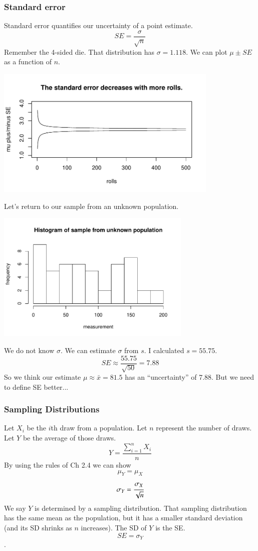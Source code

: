 \begin{frame}
\frametitle{Standard error}
Standard error quantifies our uncertainty of a point estimate.
$$SE = \frac{\sigma}{\sqrt{n}} $$
\pause
Remember the 4-sided die. That distribution has $\sigma = 1.118$. We can plot $\mu \pm SE$ as a function of $n$.
\begin{center}
\includegraphics[width=0.8\textwidth]{4-1_var_in_est/figures/running_mean_4sided_die/running_die_SE.pdf}
\end{center}
\end{frame}


\begin{frame}
Let's return to our sample from an unknown population.
\begin{center}
\includegraphics[width=0.7\textwidth]{4-1_var_in_est/figures/running_mean_4sided_die/weight_hist.pdf}
\end{center}
We do not know $\sigma$. \pause We can estimate $\sigma$ from $s$. \pause I calculated $s=55.75$.\pause
$$SE \approx \frac{55.75}{\sqrt{50}} = 7.88$$
\pause
So we think our estimate $\mu \approx \bar{x} = 81.5$ has an ``uncertainty'' of 7.88. But we need to define SE better...
\end{frame}


\begin{frame}
\frametitle{Sampling Distributions}
Let $X_i$ be the $i$th draw from a population. Let $n$ represent the number of draws. Let $Y$ be the average of those draws.
$$Y = \frac{\sum\limits_{i=1}^n X_i}{n}$$
By using the rules of Ch 2.4 we can show
$$\mu_Y = \mu_X$$
$$\sigma_{Y} = \cfrac{\sigma_X}{\sqrt{n}} $$
We say $Y$ is determined by a sampling distribution. That sampling distribution has the same mean as the population, but it has a smaller standard deviation (and its SD shrinks as $n$ increases). The SD of $Y$ is the SE.
 $$SE = \sigma_Y$$. 
\end{frame}


